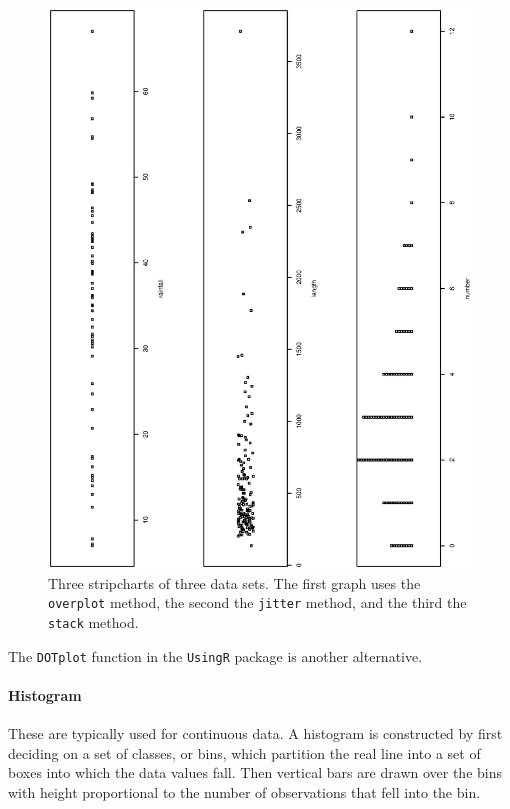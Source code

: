 \documentclass[captions=tableheading]{scrbook}
\begin{document}
\begin{figure}[th]
    \includegraphics[angle=270, totalheight=4in]{img/stripcharts.ps}
    \caption[Strip charts of \texttt{precip}, \texttt{rivers}, and \texttt{discoveries}]{\small Three stripcharts of three data sets.  The first graph uses the \texttt{overplot} method, the second the \texttt{jitter} method, and the third the \texttt{stack} method.}
    \label{fig:stripcharts}
  \end{figure}

The \texttt{DOTplot} function in the \texttt{UsingR} package \cite{usingr} is another alternative.

\paragraph*{Histogram}

These are typically used for continuous data. A histogram is constructed by first deciding on a set of classes, or bins, which partition the real line into a set of boxes into which the data values fall. Then vertical bars are drawn over the bins with height proportional to the number of observations that fell into the bin. 
\end{document}
